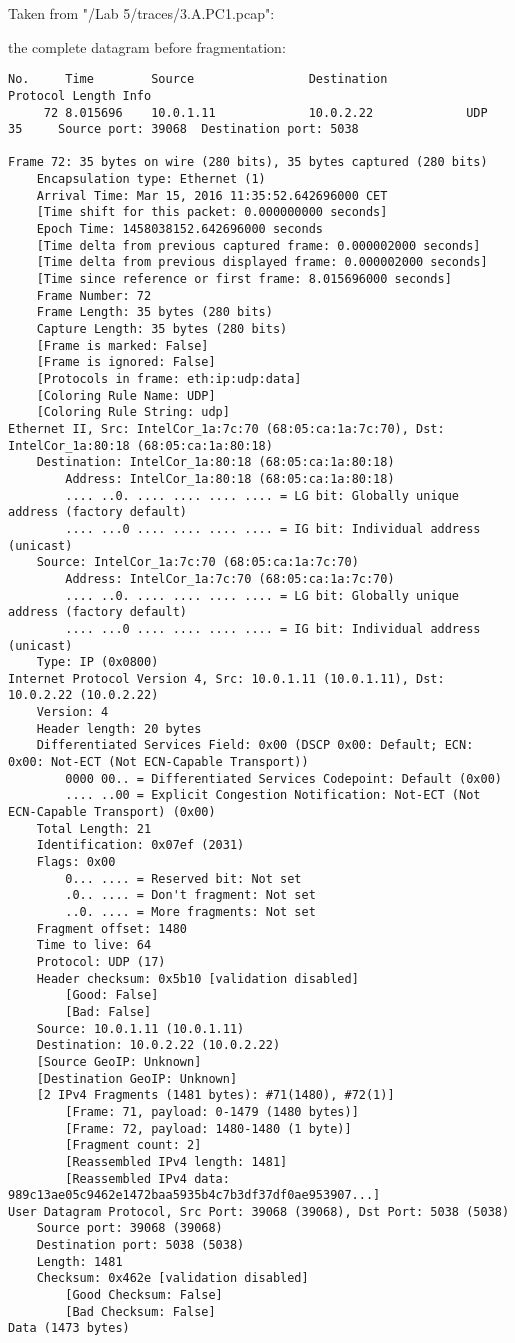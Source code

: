 Taken from "/Lab 5/traces/3.A.PC1.pcap":

the complete datagram before fragmentation:
\begin{lstlisting}
No.     Time        Source                Destination           Protocol Length Info
     72 8.015696    10.0.1.11             10.0.2.22             UDP      35     Source port: 39068  Destination port: 5038

Frame 72: 35 bytes on wire (280 bits), 35 bytes captured (280 bits)
    Encapsulation type: Ethernet (1)
    Arrival Time: Mar 15, 2016 11:35:52.642696000 CET
    [Time shift for this packet: 0.000000000 seconds]
    Epoch Time: 1458038152.642696000 seconds
    [Time delta from previous captured frame: 0.000002000 seconds]
    [Time delta from previous displayed frame: 0.000002000 seconds]
    [Time since reference or first frame: 8.015696000 seconds]
    Frame Number: 72
    Frame Length: 35 bytes (280 bits)
    Capture Length: 35 bytes (280 bits)
    [Frame is marked: False]
    [Frame is ignored: False]
    [Protocols in frame: eth:ip:udp:data]
    [Coloring Rule Name: UDP]
    [Coloring Rule String: udp]
Ethernet II, Src: IntelCor_1a:7c:70 (68:05:ca:1a:7c:70), Dst: IntelCor_1a:80:18 (68:05:ca:1a:80:18)
    Destination: IntelCor_1a:80:18 (68:05:ca:1a:80:18)
        Address: IntelCor_1a:80:18 (68:05:ca:1a:80:18)
        .... ..0. .... .... .... .... = LG bit: Globally unique address (factory default)
        .... ...0 .... .... .... .... = IG bit: Individual address (unicast)
    Source: IntelCor_1a:7c:70 (68:05:ca:1a:7c:70)
        Address: IntelCor_1a:7c:70 (68:05:ca:1a:7c:70)
        .... ..0. .... .... .... .... = LG bit: Globally unique address (factory default)
        .... ...0 .... .... .... .... = IG bit: Individual address (unicast)
    Type: IP (0x0800)
Internet Protocol Version 4, Src: 10.0.1.11 (10.0.1.11), Dst: 10.0.2.22 (10.0.2.22)
    Version: 4
    Header length: 20 bytes
    Differentiated Services Field: 0x00 (DSCP 0x00: Default; ECN: 0x00: Not-ECT (Not ECN-Capable Transport))
        0000 00.. = Differentiated Services Codepoint: Default (0x00)
        .... ..00 = Explicit Congestion Notification: Not-ECT (Not ECN-Capable Transport) (0x00)
    Total Length: 21
    Identification: 0x07ef (2031)
    Flags: 0x00
        0... .... = Reserved bit: Not set
        .0.. .... = Don't fragment: Not set
        ..0. .... = More fragments: Not set
    Fragment offset: 1480
    Time to live: 64
    Protocol: UDP (17)
    Header checksum: 0x5b10 [validation disabled]
        [Good: False]
        [Bad: False]
    Source: 10.0.1.11 (10.0.1.11)
    Destination: 10.0.2.22 (10.0.2.22)
    [Source GeoIP: Unknown]
    [Destination GeoIP: Unknown]
    [2 IPv4 Fragments (1481 bytes): #71(1480), #72(1)]
        [Frame: 71, payload: 0-1479 (1480 bytes)]
        [Frame: 72, payload: 1480-1480 (1 byte)]
        [Fragment count: 2]
        [Reassembled IPv4 length: 1481]
        [Reassembled IPv4 data: 989c13ae05c9462e1472baa5935b4c7b3df37df0ae953907...]
User Datagram Protocol, Src Port: 39068 (39068), Dst Port: 5038 (5038)
    Source port: 39068 (39068)
    Destination port: 5038 (5038)
    Length: 1481
    Checksum: 0x462e [validation disabled]
        [Good Checksum: False]
        [Bad Checksum: False]
Data (1473 bytes)


\end{lstlisting}
